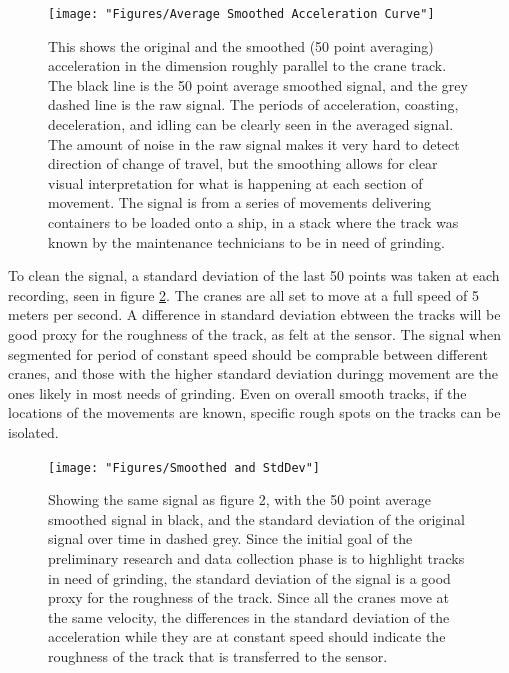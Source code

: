 \documentclass[journal=jacsat,manuscript=article]{achemso}
\begin{document}
\begin{figure}
	\centering
	\texttt{[image: "Figures/Average Smoothed Acceleration Curve"]}
	\caption[Sample Acceleration]{This shows the original and the smoothed (50 point averaging) acceleration in the dimension roughly parallel to the crane track. The black line is the 50 point average smoothed signal, and the grey dashed line is the raw signal.  The periods of acceleration, coasting, deceleration, and idling can be clearly seen in the averaged signal. The amount of noise in the raw signal makes it very hard to detect direction of change of travel, but the smoothing allows for clear visual interpretation for what is happening at each section of movement.  The signal is from a series of movements delivering containers to be loaded onto a ship, in a stack where the track was known by the maintenance technicians to be in need of grinding.}
	\label{fig:Sample-Acceleration-Curve}
\end{figure}

To clean the signal, a standard deviation of the last 50 points was taken at each recording, seen in figure \ref{fig:Smoothed_StdDev}.  The cranes are all set to move at a full speed of 5 meters per second.  A difference in standard deviation ebtween the tracks will be good proxy for the roughness of the track, as felt at the sensor.  The signal when segmented for period of constant speed should be comprable between different cranes, and those with the higher standard deviation duringg movement are the ones likely in most needs of grinding.  Even on overall smooth tracks, if the locations of the movements are known, specific rough spots on the tracks can be isolated.

\begin{figure}
	\centering
	\texttt{[image: "Figures/Smoothed and StdDev"]}
	\caption[Smoothed and StdDev]{Showing the same signal as figure 2, with the 50 point average smoothed signal in black, and the standard deviation of the original signal over time in dashed grey.  Since the initial goal of the preliminary research and data collection phase is to highlight tracks in need of grinding, the standard deviation of the signal is a good proxy for the roughness of the track.  Since all the cranes move at the same velocity, the differences in the standard deviation of the acceleration while they are at constant speed should indicate the roughness of the track that is transferred to the sensor.}
	\label{fig:Smoothed_StdDev}
\end{figure}
\end{document}
